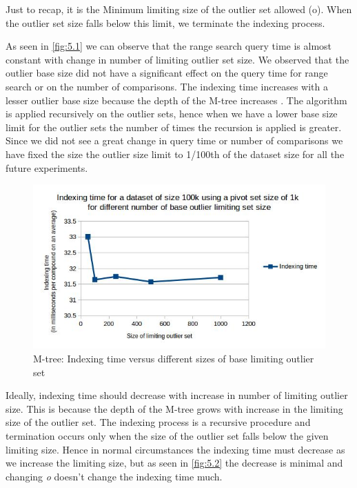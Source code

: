 Just to recap, it is the Minimum limiting size of the outlier set allowed (o). When the outlier set size falls below this limit, we terminate the indexing process.

As seen in \ref{fig:5.1} we can observe that the range search query time is almost constant with change in number of limiting outlier set size. We observed that the outlier base size did not have a significant effect on the query time for range search or on the number of comparisons. The indexing time increases with a lesser outlier base size because the depth of the M-tree increases . The algorithm is applied recursively on the outlier sets, hence when we have a lower base size limit for the outlier sets the number of times the recursion is applied is greater. Since we did not see a great change in query time or number of comparisons we have fixed the size the outlier size limit to 1/100th of the dataset size for all the future experiments.


\begin{figure}[ht!]	
\centering
\includegraphics[width=1 \columnwidth]{img/image8.jpg}
\caption{M-tree: Indexing time versus different sizes of base limiting outlier set}
\label{fig:5.2}
\end{figure}


Ideally, indexing time should decrease with increase in number of limiting outlier size. This is because the depth of the M-tree grows with increase in the limiting size of the outlier set. The indexing process is a recursive procedure and termination occurs only when the size of the outlier set falls below the given limiting size. Hence in normal circumstances the indexing time must decrease as we increase the limiting size, but as seen in \autoref{fig:5.2} the decrease is minimal and changing \textit{o} doesn't change the indexing time much. 






